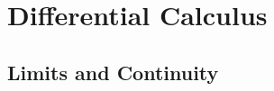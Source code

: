 \documentclass[11pt, fleqn]{article}
\begin{document}





\section{Differential Calculus}

\subsection{Limits and Continuity}
\end{document}
